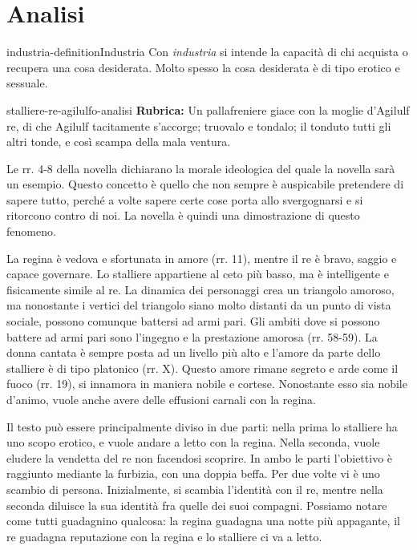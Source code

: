 \documentclass[preview]{standalone}
\begin{document}
\genpage

\section{Analisi}

\begin{snippetdefinition}{industria-definition}{Industria}
    Con \textit{industria} si intende la capacità di chi acquista o recupera una cosa desiderata.
    Molto spesso la cosa desiderata è di tipo erotico e sessuale.
\end{snippetdefinition}

\begin{snippet}{stalliere-re-agilulfo-analisi}
    \textbf{Rubrica:} Un pallafreniere giace con la moglie d'Agilulf re, di che Agilulf tacitamente s'accorge; truovalo e tondalo; il tonduto tutti gli altri tonde, e così scampa della mala ventura.

    Le rr. 4-8 della novella dichiarano la morale ideologica del quale la novella sarà un esempio.
    Questo concetto è quello che non sempre è auspicabile pretendere di sapere tutto,
    perché a volte sapere certe cose porta allo svergognarsi e si ritorcono contro di noi.
    La novella è quindi una dimostrazione di questo fenomeno.
    
    La regina è vedova e sfortunata in amore (rr. 11),
    mentre il re è bravo, saggio e capace governare.
    Lo stalliere appartiene al ceto più basso, ma è intelligente e fisicamente simile al re.
    La dinamica dei personaggi crea un triangolo amoroso, ma nonostante
    i vertici del triangolo siano molto distanti da un punto di vista sociale, possono comunque battersi ad armi pari.
    Gli ambiti dove si possono battere ad armi pari sono l'ingegno e la prestazione amorosa (rr. 58-59).
    La donna cantata è sempre posta ad un livello più alto e l'amore da parte dello stalliere
    è di tipo platonico (rr. X).
    Questo amore rimane segreto e arde come il fuoco (rr. 19), si innamora in maniera nobile e
    cortese. Nonostante esso sia nobile d'animo, vuole anche avere delle effusioni carnali con la regina.
    
    Il testo può essere principalmente diviso in due parti: nella prima lo stalliere
    ha uno scopo erotico, e vuole andare a letto con la regina. Nella seconda,
    vuole eludere la vendetta del re non facendosi scoprire.
    In ambo le parti l'obiettivo è raggiunto mediante la furbizia, con una doppia beffa.
    Per due volte vi è uno scambio di persona. Inizialmente, si scambia l'identità con il re, mentre
    nella seconda diluisce la sua identità fra quelle dei suoi compagni.
    Possiamo notare come tutti guadagnino qualcosa: la regina guadagna una notte più appagante,
    il re guadagna reputazione con la regina e lo stalliere ci va a letto.
    

\end{snippet}
\end{document}
